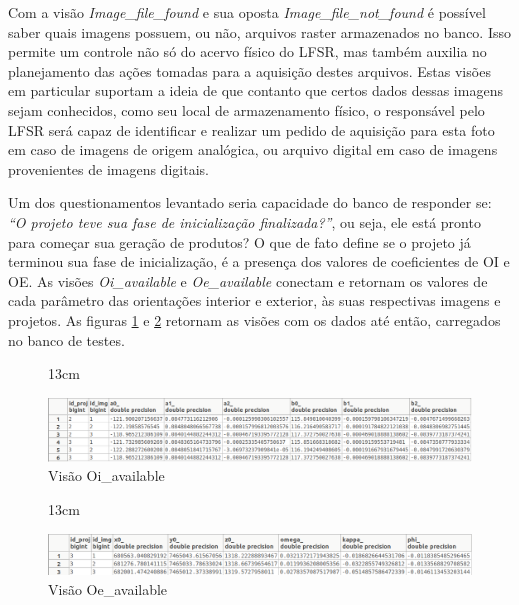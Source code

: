 Com a visão \textit{Image\_file\_found} e sua oposta \textit{Image\_file\_not\_found} é possível saber quais imagens possuem, ou não, arquivos raster armazenados no banco. Isso permite um controle não só do acervo físico do LFSR, mas também auxilia no planejamento das ações tomadas para a aquisição destes arquivos. Estas visões em particular suportam a ideia de que contanto que certos dados dessas imagens sejam conhecidos, como seu local de armazenamento físico, o responsável pelo LFSR será capaz de identificar e realizar um pedido de aquisição para esta foto em caso de imagens de origem analógica, ou arquivo digital em caso de imagens provenientes de imagens digitais.

Um dos questionamentos levantado seria capacidade do banco de responder se: \textit{``O projeto teve sua fase de inicialização finalizada?''}, ou seja, ele está pronto para começar sua geração de produtos? O que de fato define se o projeto já terminou sua fase de inicialização, é a presença dos valores de coeficientes de OI e OE. As visões \textit{Oi\_available} e \textit{Oe\_available} conectam e retornam os valores de cada parâmetro das orientações interior e exterior, às suas respectivas imagens e projetos. As figuras \ref{oi_v} e \ref{oe_v} retornam as visões com os dados até então, carregados no banco de testes.

\begin{figure}[!ht]{13cm}
  \caption{Visão Oi\_available} \label{oi_v}
  \centering
  \includegraphics[width=1.1\textwidth, height=0.2\hsize]{figuras/oi.png}
\end{figure}
\begin{figure}[!ht]{13cm}
  \caption{Visão Oe\_available} \label{oe_v}
  \centering
  \includegraphics[width=1.1\textwidth, height=0.15\hsize]{figuras/oe.png}
\end{figure}

